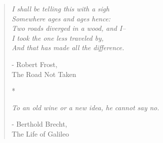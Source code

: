 \vspace{20mm}
\begin{quote}

\textit{I shall be telling this with a sigh \\
Somewhere ages and ages hence: \\
Two roads diverged in a wood, and I-- \\
I took the one less traveled by, \\
And that has made all the difference.
}

\vspace{-7mm}

\begin{flushright}
	- Robert Frost, \\ The Road Not Taken
\end{flushright}

\begin{center}
	*
\end{center}

\textit{To an old wine or a new idea, he cannot say no.}

\vspace{-7mm}

\begin{flushright}
	- Berthold Brecht, \\ The Life of Galileo
\end{flushright}

\end{quote}
